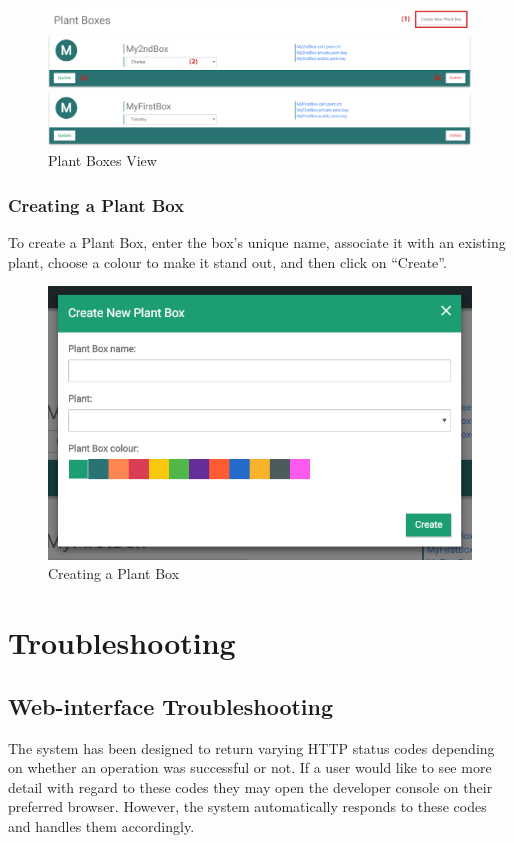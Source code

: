 \documentclass{article}
\begin{document}
	\begin{figure}[H]
		\includegraphics[width=\textwidth]{../images/UserManual/plant-boxes.png}
		\caption{Plant Boxes View}
	\end{figure}	
	
	\subsubsection{Creating a Plant Box}
	\label{sec:creating-a-plant-box}
	To create a Plant Box, enter the box's unique name, associate it with an existing plant, choose a colour to make it stand out, and then click on ``Create''.
	\begin{figure}[H]
		\includegraphics[width=\textwidth]{../images/UserManual/create-plant-box.png}
		\caption{Creating a Plant Box}
	\end{figure}
	
\section{Troubleshooting}

\subsection{Web-interface Troubleshooting}
	The system has been designed to return varying HTTP status codes depending on whether an operation was successful or not. If a user would like to see more detail with regard to these codes they may open the developer console on their preferred browser. However, the system automatically responds to these codes and handles them accordingly.\\
	
\end{document}
